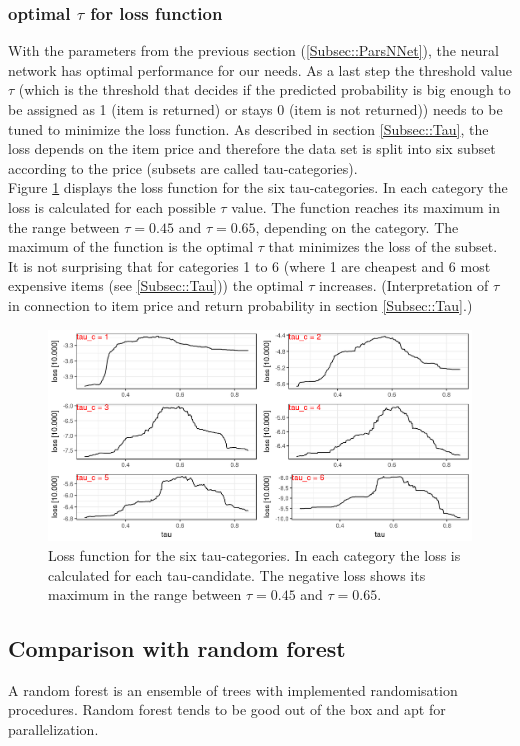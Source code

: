 \documentclass[a4paper,12pt]{article}
\begin{document}
\subsubsection{optimal $\tau$ for loss function}
With the parameters from the previous section (\ref{Subsec::ParsNNet}), the neural network has optimal performance for our needs. As a last step the threshold value $\tau$ (which is the threshold that decides if the predicted probability is big enough to be assigned as 1 (item is returned) or stays 0 (item is not returned)) needs to be tuned to minimize the loss function. As described in section \ref{Subsec::Tau}, the loss depends on the item price and therefore the data set is split into six subset according to the price (subsets are called tau-categories). \\
Figure \ref{Figure::FindTau} displays the loss function for the six tau-categories. In each category the loss is calculated for each possible $\tau$ value. The function reaches its maximum in the range between $\tau=0.45$ and $\tau = 0.65$, depending on the category. The maximum of the function is the optimal $\tau$ that minimizes the loss of the subset. It is not surprising that for categories 1 to 6 (where 1 are cheapest and 6 most expensive items (see \ref{Subsec::Tau})) the optimal $\tau$ increases. (Interpretation of $\tau$ in connection to item price and return probability in section \ref{Subsec::Tau}.)

\begin{figure}
 \includegraphics[width=\textwidth]{pictures/find_tau.png}
 \caption{Loss function for the six tau-categories. In each category the loss is calculated for each tau-candidate. The negative loss shows its maximum in the range between $\tau=0.45$ and $\tau = 0.65$.}
 \label{Figure::FindTau}
\end{figure}

\subsection{Comparison with random forest}
A random forest is an ensemble of trees with implemented randomisation procedures.
Random forest tends to be good out of the box and apt for parallelization.
\end{document}
